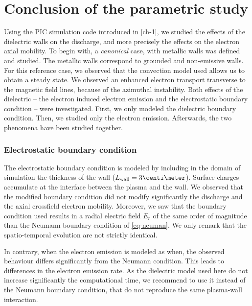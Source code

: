 
\section{Conclusion of the parametric study}
  \label{sec-conclusion_ch2}
  
  Using the \ac{PIC} simulation code introduced in \cref{ch-1}, we studied the effects of the dielectric walls on the discharge, and more precisely the effects on the electron axial mobility.
  To begin with, a \emph{canonical} case, with metallic walls was defined and studied.
  The metallic walls correspond to grounded and non-emissive walls.
  For this reference case, we observed that the convection model used allows us to obtain a steady state.
  We observed an enhanced electron transport transverse to the magnetic field lines, because of the azimuthal instability.
  Both effects of the dielectric -- the electron induced electron emission and the electrostatic boundary condition -- were investigated.
  First, we  only modeled the dielectric boundary condition. Then, we studied only the electron emission. Afterwards, the two phenomena have been studied together.
  
  \subsubsection*{Electrostatic boundary condition}
  
  The electrostatic boundary condition is modeled by including in the domain of simulation the thickness of the wall ($L_{\rm wall} = 3 \centi\meter$).
  Surface charges accumulate at the interface between the plasma and the wall.
  We observed that the modified boundary condition did not modify significantly the discharge and the axial crossfield electron mobility.
  Moreover, we saw that the boundary condition used results in a radial electric field $E_r$ of the same order of magnitude than the Neumann boundary condition of \cref{eq-neuman}.
  We only remark that the spatio-temporal evolution are not strictly identical.
  
  In contrary, when the electron emission is modeled as when, the observed behaviour differs significantly from the Neumann condition.
  This leads to differences in the electron emission rate.
  As the dielectric model used here do not increase significantly the computational time, we recommend to use it instead of the Neumann boundary condition, that do not reproduce the same plasma-wall interaction.
  

